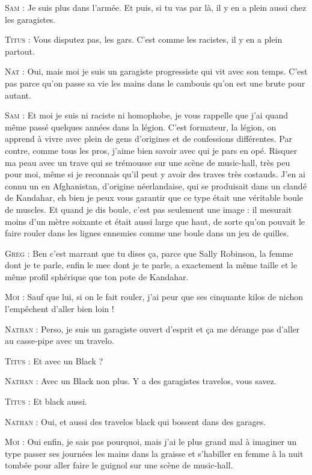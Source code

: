 \begin{dialogue}
\textsc{Sam} : Je suis plus dans l’armée. Et puis, si tu vas par là, il y en a plein aussi chez les garagistes.

\textsc{Titus} : Vous disputez pas, les gars. C’est comme les racistes, il y en a plein partout.

\textsc{Nat} : Oui, mais moi je suis un garagiste progressiste qui vit avec son temps. C’est pas parce qu’on passe sa vie les mains dans le cambouis qu’on est une brute pour autant.

\textsc{Sam} : Et moi je suis ni raciste ni homophobe, je vous rappelle que j’ai quand même passé quelques années dans la légion. C’est formateur, la légion, on apprend à vivre avec plein de gens d’origines et de confessions différentes. Par contre, comme tous les pros, j’aime bien savoir avec qui je pars en opé. Risquer ma peau avec un trave qui se trémousse sur une scène de music-hall, très peu pour moi, même si je reconnais qu’il peut y avoir des traves très costauds. J’en ai connu un en Afghanistan, d’origine néerlandaise, qui se produisait dans un clandé de Kandahar, eh bien je peux vous garantir que ce type était une véritable boule de muscles. Et quand je dis boule, c’est pas seulement une image : il mesurait moins d’un mètre soixante et était aussi large que haut, de sorte qu’on pouvait le faire rouler dans les lignes ennemies comme une boule dans un jeu de quilles.

\textsc{Greg} : Ben c’est marrant que tu dises ça, parce que Sally Robinson, la femme dont je te parle, enfin le mec dont je te parle, a exactement la même taille et le même profil sphérique que ton pote de Kandahar.

\textsc{Moi} : Sauf que lui, si on le fait rouler, j’ai peur que ses cinquante kilos de nichon l’empêchent d’aller bien loin !

\textsc{Nathan} : Perso, je suis un garagiste ouvert d’esprit et ça me dérange pas d’aller au casse-pipe avec un travelo.

\textsc{Titus} : Et avec un Black ?

\textsc{Nathan} : Avec un Black non plus. Y a des garagistes travelos, vous savez.

\textsc{Titus} : Et black aussi.

\textsc{Nathan} : Oui, et aussi des travelos black qui bossent dans des garages.

\textsc{Moi} : Oui enfin, je sais pas pourquoi, mais j’ai le plus grand mal à imaginer un type passer ses journées les mains dans la graisse et s’habiller en femme à la nuit tombée pour aller faire le guignol sur une scène de music-hall.


\end{dialogue}
